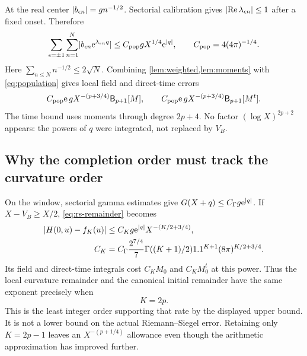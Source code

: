 At the real center \(\lvert b_{\epsilon n}\rvert=g n^{-1/2}\).
Sectorial calibration gives \(\lvert \operatorname{Re}\lambda_{\epsilon n}\rvert\le1\)
after a fixed onset. Therefore
\begin{equation}
 \sum_{\epsilon=\pm1}\sum_{n=1}^N
       \lvert b_{\epsilon n}\mathrm e^{\lambda_{\epsilon n}q}\rvert
 \le C_{\mathrm{pop}}gX^{1/4}\mathrm e^{\lvert q\rvert},
 \qquad C_{\mathrm{pop}}=4(4\pi)^{-1/4}.
 \label{eq:population}
\end{equation}
Here \(\sum_{n\le N}n^{-1/2}\le2\sqrt N\).
Combining \cref{lem:weighted,lem:moments} with
\eqref{eq:population} gives local field and direct-time errors
\begin{equation}
 C_{\mathrm{pop}}\mathrm e\,gX^{-(p+3/4)}\mathsf B_{p+1}[M],
 \qquad
 C_{\mathrm{pop}}\mathrm e\,gX^{-(p+3/4)}\mathsf B_{p+1}[M^t].
 \label{eq:local-payments}
\end{equation}
The time bound uses moments through degree \(2p+4\).
No factor \((\log X)^{2p+2}\) appears: the powers of \(q\) were
integrated, not replaced by \(V_B\).

\subsection{Why the completion order must track the curvature order}
\label{subsec:matching}
On the window, sectorial gamma estimates give
\(G(X+q)\le C_\Gamma g\mathrm e^{\lvert q\rvert}\).
If \(X-V_B\ge X/2\), \eqref{eq:rs-remainder} becomes
\begin{subequations}\label{eq:CK}
\begin{align}
 \lvert H(0,u)-f_K(u)\rvert
 &\le C_Kg\mathrm e^{\lvert q\rvert}X^{-(K/2+3/4)},\\
 C_K&=C_\Gamma\frac{2^{7/4}}7
 \Gamma((K+1)/2)1.1^{K+1}(8\pi)^{K/2+3/4}.
\end{align}
\end{subequations}
Its field and direct-time integrals cost \(C_KM_0\) and \(C_KM_0^t\)
at this power. Thus the local curvature remainder and the canonical
initial remainder have the same exponent precisely when
\begin{equation}
 K=2p.
 \label{eq:matching}
\end{equation}
This is the least integer order supporting that rate by the
displayed upper bound. It is not a lower bound on the actual
Riemann--Siegel error. Retaining only \(K=2p-1\) leaves an
\(X^{-(p+1/4)}\) allowance even though the arithmetic approximation
has improved further.

